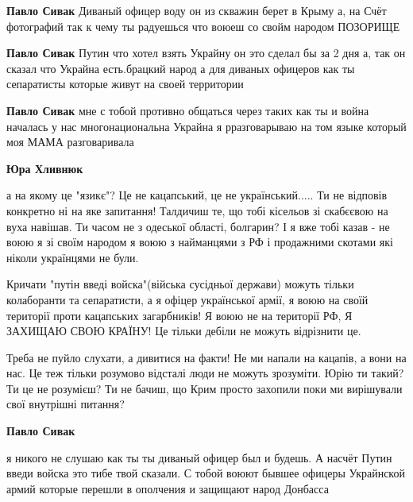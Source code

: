 \begin{itemize}
\begin{itemize}
\textbf{Павло Сивак} Диваный офицер воду он из скважин берет в Крыму а, на Счёт
фотографий так к чему ты радуешься что воюеш со свойм народом ПОЗОРИЩЕ

\textbf{Павло Сивак} Путин что хотел взять Украйну он это сделал бы за 2 дня а,
так он сказал что Украйна есть.брацкий народ а для диваных офицеров как ты
сепаратисты которые живут на своей территории

\textbf{Павло Сивак} мне с тобой противно общаться через таких как ты и война
началась у нас многонациональна Украйна я рразговарываю на том языке который
моя МАМА разговаривала

\textbf{Юра Хливнюк} 

а на якому це "язикє"? Це не кацапський, це не
український..... Ти не відповів конкретно ні на яке запитання! Талдичиш те, що
тобі кісельов зі скабєєвою на вуха навішав. Ти часом не з одеської області,
болгарин? І я вже тобі казав - не воюю я зі своїм народом я воюю з найманцями з
РФ і продажними скотами які ніколи українцями не були. 

Кричати "путін введі
войска"(війська сусідньої держави) можуть тільки колаборанти та сепаратисти, а
я офіцер української армії, я воюю на своїй території проти кацапських
загарбників! Я воюю не на території РФ, Я ЗАХИЩАЮ СВОЮ КРАЇНУ! Це тільки дебіли
не можуть відрізнити це. 

Треба не пуйло слухати, а дивитися на факти! Не ми
напали на кацапів, а вони на нас. Це теж тільки розумово відсталі люди не
можуть зрозуміти. Юрію ти такий? Ти це не розумієш? Ти не бачиш, що Крим просто
захопили поки ми вирішували свої внутрішні питання?

\textbf{Павло Сивак} 

я никого не слушаю как ты ты диваный офицер был и будешь.
А насчёт Путин введи войска это тибе твой сказали. С тобой воюют бывшее офицеры
Украйнской армий которые перешли в ополчения и защищают народ Донбасса
\end{itemize}


\end{itemize}

